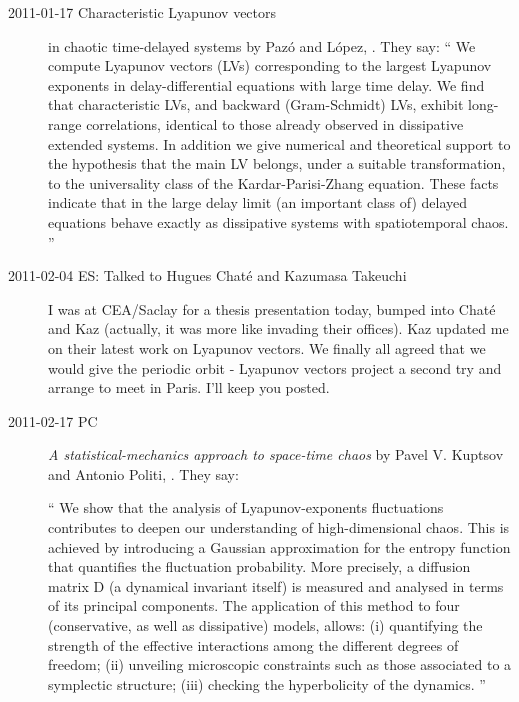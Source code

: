 \begin{description}
\item[2011-01-17 Characteristic {Lyapunov} vectors]
in chaotic time-delayed systems
by Paz{\'o} and L{\'o}pez,
. They say:
``
We compute Lyapunov vectors (LVs) corresponding to the largest Lyapunov
exponents in delay-differential equations with large time delay. We find
that characteristic LVs, and backward (Gram-Schmidt) LVs, exhibit
long-range correlations, identical to those already observed in
dissipative extended systems. In addition we give numerical and
theoretical support to the hypothesis that the main LV belongs, under a
suitable transformation, to the universality class of the
Kardar-Parisi-Zhang equation. These facts indicate that in the large
delay limit (an important class of) delayed equations behave exactly as
dissipative systems with spatiotemporal chaos.
''
\item[2011-02-04 ES: Talked to Hugues Chat\'{e} and Kazumasa Takeuchi]

I was at CEA/Saclay for a thesis presentation today, bumped into Chat\'{e}
and Kaz (actually, it was more like invading their offices). Kaz updated me on
their latest work on Lyapunov vectors. We finally all agreed that we would give
the periodic orbit - Lyapunov vectors project a second try and arrange to meet
in Paris. I'll keep you posted.

\item[2011-02-17 PC]
\emph{A statistical-mechanics approach to space-time chaos}
by  Pavel V. Kuptsov and Antonio Politi,
. They say:

``
We show that the analysis of Lyapunov-exponents fluctuations
contributes to deepen our understanding of high-dimensional chaos. This is
achieved by introducing a Gaussian approximation for the entropy function that
quantifies the fluctuation probability. More precisely, a diffusion matrix D (a
dynamical invariant itself) is measured and analysed in terms of its principal
components. The application of this method to four (conservative, as well as
dissipative) models, allows: (i) quantifying the strength of the effective
interactions among the different degrees of freedom; (ii) unveiling microscopic
constraints such as those associated to a symplectic structure; (iii) checking
the hyperbolicity of the dynamics.
''

\end{description}

